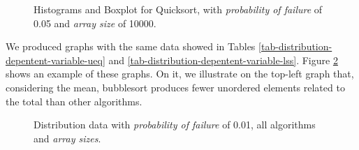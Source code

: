 \begin{figure}[H]
    \centering
    \caption{Histograms and Boxplot for Quicksort, with \textit{probability of failure} of 0.05 and \textit{array size} of 10000.}
    \label{fig-histogram-boxplot-quick-00510000}
\end{figure}

We produced graphs with the same data showed in Tables \ref{tab-distribution-depentent-variable-ueq} and \ref{tab-distribution-depentent-variable-lss}. Figure \ref{fig-distribution-all-algorithms-001-all-sizes} shows an example of these graphs. On it, we illustrate on the top-left graph that, considering the mean, bubblesort produces fewer unordered elements related to the total than other algorithms.

\begin{figure}[H]
    \centering
    \caption{Distribution data with \textit{probability of failure} of 0.01, all algorithms and \textit{array sizes}.}
    \label{fig-distribution-all-algorithms-001-all-sizes}
\end{figure}


